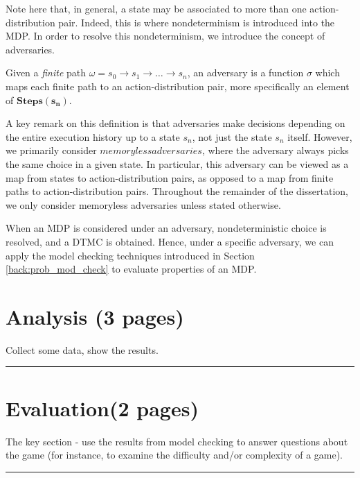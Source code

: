 Note here that, in general, a state may be associated to more than one action-distribution pair. Indeed, this is where nondeterminism is introduced into the MDP. In order to resolve this nondeterminism, we introduce the concept of adversaries.

\begin{definition}
\label{cs1:adversaries}

Given a \emph{finite} path $\omega = s_0 \rightarrow s_1 \rightarrow \dots \rightarrow s_n$, an adversary is a function $\sigma$ which maps each finite path to an action-distribution pair, more specifically an element of $\mathbf{Steps(s_n)}$.

\end{definition}

A key remark on this definition is that adversaries make decisions depending on the entire execution history up to a state $s_n$, not just the state $s_n$ itself. However, we primarily consider $memoryless adversaries$, where the adversary always picks the same choice in a given state. In particular, this adversary can be viewed as a map from states to action-distribution pairs, as opposed to a map from finite paths to action-distribution pairs. Throughout the remainder of the dissertation, we only consider memoryless adversaries unless stated otherwise.

When an MDP is considered under an adversary, nondeterministic choice is resolved, and a DTMC is obtained. Hence, under a specific adversary, we can apply the model checking techniques introduced in Section \ref{back:prob_mod_check} to evaluate properties of an MDP.

\section{Analysis (3 pages)}

Collect some data, show the results.

\hrule

\Blindtext

\Blindtext

\Blindtext

\section{Evaluation(2 pages)}

The key section - use the results from model checking to answer questions about the game (for instance, to examine the difficulty and/or complexity of a game).

\hrule

\Blindtext

\Blindtext